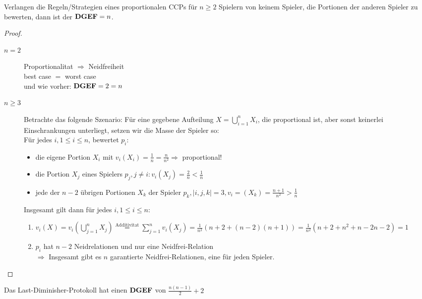 \begin{defi}[lemma]
 Verlangen die Regeln/Strategien eines proportionalen CCPs für $n\geq2$ Spielern von keinem Spieler, die Portionen der anderen Spieler
 zu bewerten, dann ist der $\text{\textbf{DGEF}}=n$.
\end{defi}
\begin{proof}
 \begin{description}
  \item[$n=2$] Proportionalitat $\Rightarrow$ Neidfreiheit\\best case $=$ worst case\\und wie vorher: $\text{\textbf{DGEF}}=2=n$
  \item[$n\geq3$] Betrachte das folgende Szenario: Für eine gegebene Aufteilung $X=\bigcup\limits_{i=1}^nX_i$, die proportional ist, aber sonst
                  keinerlei Einschrankungen unterliegt, setzen wir die Masse der Spieler so: \\Für jedes $i, 1\leq i\leq n$, bewertet $p_i$:
                  \begin{itemize}
                   \item die eigene Portion $X_i$ mit $v_i(X_i)=\frac{1}{n}=\frac{n}{n^2}\Rightarrow$ proportional!
                   \item die Portion $X_j$ eines Spielers $p_j, j\neq i: v_i(X_j)=\frac{2}{n}<\frac{1}{n}$
                   \item jede der $n-2$ übrigen Portionen $X_k$ der Spieler $p_k, |{i,j,k}|=3, v_i=(X_k)=\frac{n+1}{n^2}>\frac{1}{n}$
                  \end{itemize}
                  Insgesamt gilt dann für jedes $i, 1\leq i\leq n$:
                  \begin{enumerate}
                   \item $v_i(X)=v_i(\bigcup\limits_{j=1}^nX_j)\stackrel{\text{Additivitat}}{=}\sum\limits_{j=1}^nv_i(X_j)=
                         \frac{1}{n^2}(n+2+(n-2)(n+1))=\frac{1}{n^2}(n+2+n^2+n-2n-2)=1$
                   \item $p_i$ hat $n-2$ Neidrelationen und nur eine Neidfrei-Relation\\$\Rightarrow$ Insgesamt gibt es $n$ garantierte 
                         Neidfrei-Relationen, eine für jeden Spieler.
                  \end{enumerate}
 \end{description}
\end{proof}
\begin{satz}
 Das Last-Diminisher-Protokoll hat einen $\text{\textbf{DGEF}}$ von $\frac{n(n-1)}{2}+2$
\end{satz}
